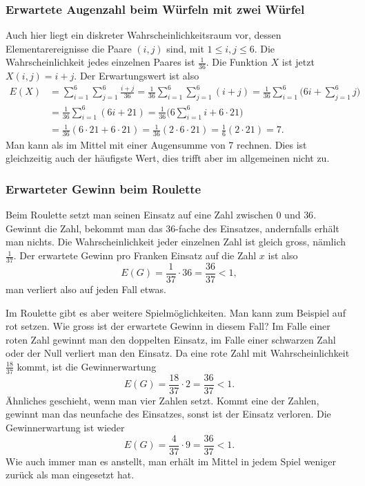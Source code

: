 \subsubsection{Erwartete Augenzahl beim Würfeln mit zwei Würfel}
Auch hier liegt ein diskreter Wahrscheinlichkeitsraum vor, dessen
Elementarereignisse die Paare $(i,j)$ sind, mit $1\le i,j\le 6$.
Die Wahrscheinlichkeit jedes einzelnen Paares ist $\frac1{36}$.
Die Funktion $X$ ist jetzt $X(i,j)=i+j$.
Der Erwartungswert ist
also
\begin{align*}
E(X)&=\sum_{i=1}^6\sum_{j=1}^6\frac{i+j}{36}
=\frac1{36}\sum_{i=1}^6\sum_{j=1}^6(i+j)
=\frac1{36}\sum_{i=1}^6\bigl(6i + \sum_{j=1}^6j\bigr)\\
&=\frac1{36}\sum_{i=1}^6(6i + 21)
=\frac1{36}\bigl(6\sum_{i=1}^6i + 6\cdot21 \bigr)\\
&=\frac1{36}(6\cdot 21 + 6\cdot21 )
=\frac1{36}(2\cdot 6\cdot 21)
=\frac1{6}(2\cdot 21)
=7.
\end{align*}
Man kann als im Mittel mit einer Augensumme von 7 rechnen.
Dies ist
gleichzeitig auch der häufigste Wert, dies trifft aber im allgemeinen
nicht zu.

\subsubsection{Erwarteter Gewinn beim Roulette}
Beim Roulette setzt man seinen Einsatz auf eine Zahl zwischen $0$
und $36$.
Gewinnt die Zahl, bekommt man das 36-fache des Einsatzes,
andernfalls erhält man nichts.
Die Wahrscheinlichkeit jeder einzelnen
Zahl ist gleich gross, nämlich $\frac1{37}$.
Der erwartete Gewinn pro
Franken Einsatz auf die Zahl $x$ ist also
\[
E(G)= \frac1{37}\cdot 36=\frac{36}{37}<1,
\]
man verliert also auf jeden Fall etwas.

Im Roulette gibt es aber weitere Spielmöglichkeiten.
Man kann zum Beispiel
auf rot setzen.
Wie gross ist der erwartete Gewinn in diesem Fall?
Im Falle einer roten Zahl gewinnt man den doppelten Einsatz,
im Falle einer schwarzen Zahl oder der Null verliert man den Einsatz.
Da eine rote Zahl mit Wahrscheinlichkeit $\frac{18}{37}$ kommt, ist
die Gewinnerwartung 
\[
E(G)=\frac{18}{37}\cdot 2=\frac{36}{37}<1.
\]
Ähnliches geschieht, wenn man vier Zahlen setzt.
Kommt eine der Zahlen,
gewinnt man das neunfache des Einsatzes, sonst ist der Einsatz 
verloren.
Die Gewinnerwartung ist wieder
\[
E(G)=\frac{4}{37}\cdot 9=\frac{36}{37}<1.
\]
Wie auch immer man es anstellt, man erhält im Mittel in jedem Spiel
weniger zurück als man eingesetzt hat.

